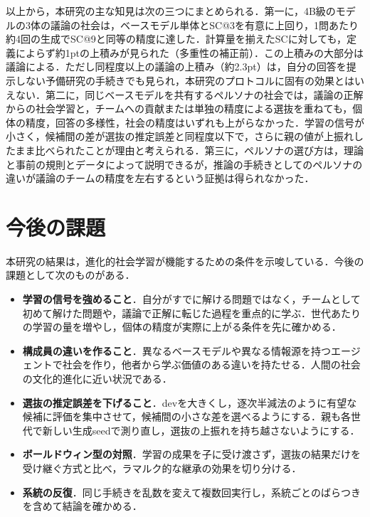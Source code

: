 以上から，本研究の主な知見は次の三つにまとめられる．第一に，4B級のモデルの3体の議論の社会は，ベースモデル単体とSC@3を有意に上回り，1問あたり約4回の生成でSC@9と同等の精度に達した．計算量を揃えたSCに対しても，定義によらず約1ptの上積みが見られた（多重性の補正前）．この上積みの大部分は議論による．ただし同程度以上の議論の上積み（約2.3pt）は，自分の回答を提示しない予備研究の手続きでも見られ，本研究のプロトコルに固有の効果とはいえない．第二に，同じベースモデルを共有するペルソナの社会では，議論の正解からの社会学習と，チームへの貢献または単独の精度による選抜を重ねても，個体の精度，回答の多様性，社会の精度はいずれも上がらなかった．学習の信号が小さく，候補間の差が選抜の推定誤差と同程度以下で，さらに親の値が上振れしたまま比べられたことが理由と考えられる．第三に，ペルソナの選び方は，理論と事前の規則とデータによって説明できるが，推論の手続きとしてのペルソナの違いが議論のチームの精度を左右するという証拠は得られなかった．

\section{今後の課題}
\label{sec:7.2}

本研究の結果は，進化的社会学習が機能するための条件を示唆している．今後の課題として次のものがある．

\begin{itemize}
\item \textbf{学習の信号を強めること}．自分がすでに解ける問題ではなく，チームとして初めて解けた問題や，議論で正解に転じた過程を重点的に学ぶ．世代あたりの学習の量を増やし，個体の精度が実際に上がる条件を先に確かめる．
\item \textbf{構成員の違いを作ること}．異なるベースモデルや異なる情報源を持つエージェントで社会を作り，他者から学ぶ価値のある違いを持たせる．人間の社会の文化的進化に近い状況である．
\item \textbf{選抜の推定誤差を下げること}．devを大きくし，逐次半減法のように有望な候補に評価を集中させて，候補間の小さな差を選べるようにする．親も各世代で新しい生成seedで測り直し，選抜の上振れを持ち越さないようにする．
\item \textbf{ボールドウィン型の対照}．学習の成果を子に受け渡さず，選抜の結果だけを受け継ぐ方式と比べ，ラマルク的な継承の効果を切り分ける．
\item \textbf{系統の反復}．同じ手続きを乱数を変えて複数回実行し，系統ごとのばらつきを含めて結論を確かめる．
\end{itemize}
